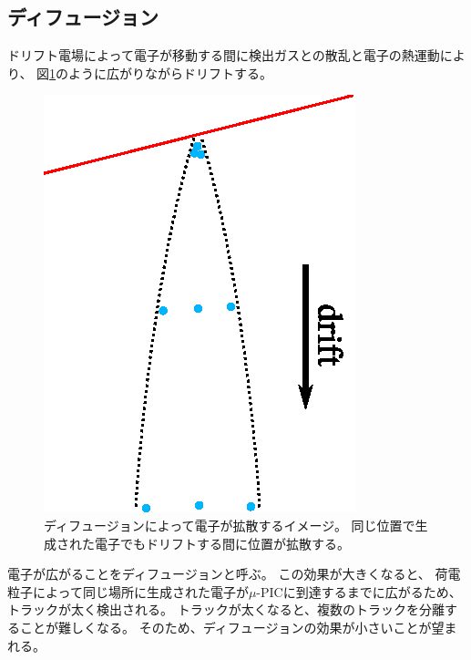 \documentclass[../master]{subfiles}
\begin{document}
\subsection{ディフュージョン}
ドリフト電場によって電子が移動する間に検出ガスとの散乱と電子の熱運動により、
図\ref{fig::diffusion-image}のように広がりながらドリフトする。
\begin{figure}
  \centering
  \includegraphics[clip, width=0.4\columnwidth]{diffusion_image.eps}
  \caption[ディフュージョンによって電子が拡散するイメージ。]
          {ディフュージョンによって電子が拡散するイメージ。
          同じ位置で生成された電子でもドリフトする間に位置が拡散する。}
  \label{fig::diffusion-image}
\end{figure}
電子が広がることをディフュージョンと呼ぶ。
この効果が大きくなると、
荷電粒子によって同じ場所に生成された電子が$\mu$-PICに到達するまでに広がるため、
トラックが太く検出される。
トラックが太くなると、複数のトラックを分離することが難しくなる。
そのため、ディフュージョンの効果が小さいことが望まれる。
\end{document}

